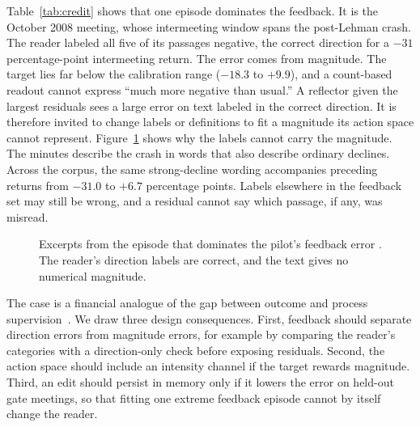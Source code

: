 \documentclass[sigconf]{acmart}
\begin{document}
Table~\ref{tab:credit} shows that one episode dominates the feedback. It is the October 2008 meeting, whose intermeeting window spans the post-Lehman crash. The reader labeled all five of its passages negative, the correct direction for a $-31$ percentage-point intermeeting return. The error comes from magnitude. The target lies far below the calibration range ($-18.3$ to $+9.9$), and a count-based readout cannot express ``much more negative than usual.'' A reflector given the largest residuals sees a large error on text labeled in the correct direction. It is therefore invited to change labels or definitions to fit a magnitude its action space cannot represent. Figure~\ref{fig:example} shows why the labels cannot carry the magnitude. The minutes describe the crash in words that also describe ordinary declines. Across the corpus, the same strong-decline wording accompanies preceding returns from $-31.0$ to $+6.7$ percentage points. Labels elsewhere in the feedback set may still be wrong, and a residual cannot say which passage, if any, was misread.

\begin{figure}[t]
\small
{}
\caption{Excerpts from the episode that dominates the pilot's feedback error . The reader's direction labels are correct, and the text gives no numerical magnitude.}
\label{fig:example}
\end{figure}

The case is a financial analogue of the gap between outcome and process supervision~\cite{uesato2022process,lightman2024verify}. We draw three design consequences. First, feedback should separate direction errors from magnitude errors, for example by comparing the reader's categories with a direction-only check before exposing residuals. Second, the action space should include an intensity channel if the target rewards magnitude. Third, an edit should persist in memory only if it lowers the error on held-out gate meetings, so that fitting one extreme feedback episode cannot by itself change the reader.
\end{document}
